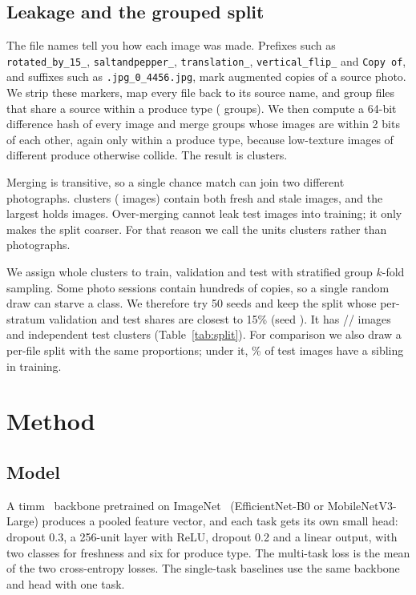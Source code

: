 \documentclass[conference]{IEEEtran}
\begin{document}
\subsection{Leakage and the grouped split}
\begin{sloppypar}
The file names tell you how each image was made. Prefixes such as
\texttt{rotated\_by\_15\_}, \texttt{saltandpepper\_}, \texttt{translation\_},
\texttt{vertical\_flip\_} and \texttt{Copy of}, and suffixes such as
\texttt{.jpg\_0\_4456.jpg}, mark augmented copies of a source photo. We strip
these markers, map every file back to its source name, and group files that
share a source within a produce type (\NFilenameGroups{} groups). We then
compute a 64-bit difference hash of every image and merge groups whose images
are within 2 bits of each other, again only within a produce type, because
low-texture images of different produce otherwise collide. The result is
\NGroups{} clusters.
\end{sloppypar}

Merging is transitive, so a single chance match can join two different
photographs. \NMixedClusters{} clusters (\NMixedClusterImgs{} images) contain
both fresh and stale images, and the largest holds \MaxClusterSize{} images.
Over-merging cannot leak test images into training; it only makes the split
coarser. For that reason we call the units clusters rather than photographs.

We assign whole clusters to train, validation and test with stratified group
$k$-fold sampling. Some photo sessions contain hundreds of copies, so a single
random draw can starve a class. We therefore try 50 seeds and keep the split
whose per-stratum validation and test shares are closest to 15\% (seed
\SplitSeed{}). It has \NTrain{}/\NVal{}/\NTest{} images and \NTestGroups{}
independent test clusters (Table~\ref{tab:split}). For comparison we also draw a
per-file split with the same proportions; under it, \NaiveLeakPct\% of test
images have a sibling in training.



\section{Method}
\subsection{Model}
A timm~\cite{wightman2019timm} backbone pretrained on ImageNet~\cite{deng2009imagenet}
(EfficientNet-B0 or MobileNetV3-Large) produces a pooled feature vector, and each
task gets its own small head: dropout 0.3, a 256-unit layer with ReLU, dropout
0.2 and a linear output, with two classes for freshness and six for produce
type. The multi-task loss is the mean of the two cross-entropy losses. The
single-task baselines use the same backbone and head with one task.
\end{document}
